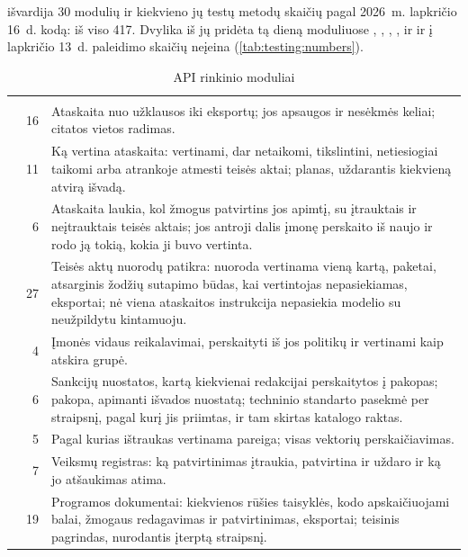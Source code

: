  išvardija 30 modulių ir kiekvieno jų testų metodų skaičių pagal
2026~m. lapkričio 16~d. kodą: iš viso 417. Dvylika iš jų pridėta tą dieną moduliuose
, , ,
,  ir  ir į lapkričio 13~d. paleidimo skaičių neįeina
(\cref{tab:testing:numbers}).

\begin{xltabular}{\textwidth}{@{}L{38mm}rY@{}}
\caption{API rinkinio moduliai}\label{tab:testing:modules}\\
\toprule
{} &  &  \\
\midrule
\endfirsthead
\toprule
{} &  &  \\
\midrule
\endhead
\bottomrule
\endlastfoot
{} & 16 & Ataskaita nuo užklausos iki eksportų; jos apsaugos ir nesėkmės keliai; citatos vietos radimas. \\
 & 11 & Ką vertina ataskaita: vertinami, dar netaikomi, tikslintini, netiesiogiai taikomi arba atrankoje atmesti teisės aktai; planas, uždarantis kiekvieną atvirą išvadą. \\
 & 6 & Ataskaita laukia, kol žmogus patvirtins jos apimtį, su įtrauktais ir neįtrauktais teisės aktais; jos antroji dalis įmonę perskaito iš naujo ir rodo ją tokią, kokia ji buvo vertinta. \\
 & 27 & Teisės aktų nuorodų patikra: nuoroda vertinama vieną kartą, paketai, atsarginis žodžių sutapimo būdas, kai vertintojas nepasiekiamas, eksportai; nė viena ataskaitos instrukcija nepasiekia modelio su neužpildytu kintamuoju. \\
 & 4 & Įmonės vidaus reikalavimai, perskaityti iš jos politikų ir vertinami kaip atskira grupė. \\
 & 6 & Sankcijų nuostatos, kartą kiekvienai redakcijai perskaitytos į pakopas; pakopa, apimanti išvados nuostatą; techninio standarto pasekmė per straipsnį, pagal kurį jis priimtas, ir tam skirtas katalogo raktas. \\
 & 5 & Pagal kurias ištraukas vertinama pareiga; visas vektorių perskaičiavimas. \\
 & 7 & Veiksmų registras: ką patvirtinimas įtraukia, patvirtina ir uždaro ir ką jo atšaukimas atima. \\
 & 19 & Programos dokumentai: kiekvienos rūšies taisyklės, kodo apskaičiuojami balai, žmogaus redagavimas ir patvirtinimas, eksportai; teisinis pagrindas, nurodantis įterptą straipsnį. \\

\end{xltabular}
